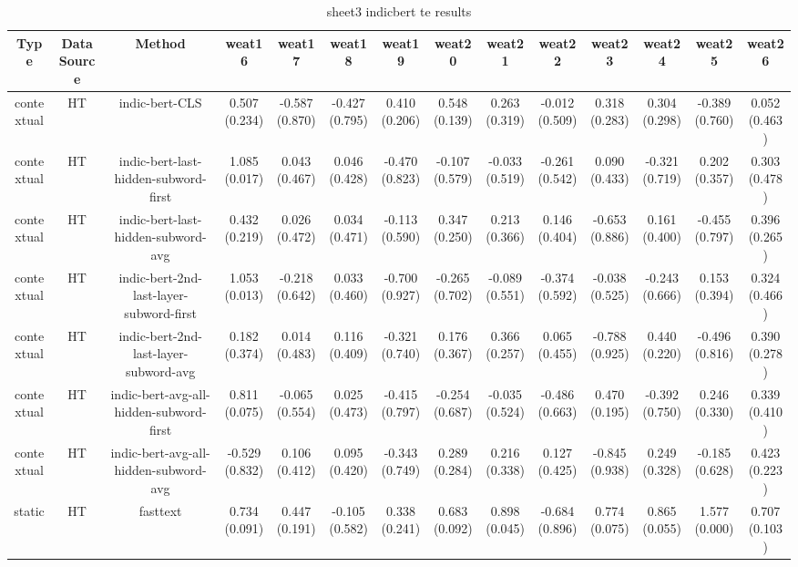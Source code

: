 \begin{sidewaystable}[htb]
    \centering
    \caption{sheet3 indicbert te results}
    \label{appendix_tab:sheet3_indicbert_te_results}
    \small
    \begin{tabular}{@{}cccccccccccccc@{}}
        \toprule
        Type & DataSource & Method & weat16 & weat17 & weat18 & weat19 & weat20 & weat21 & weat22 & weat23 & weat24 & weat25 & weat26 \\
        \midrule
        contextual & HT & indic-bert-CLS & 0.507 (0.234) & -0.587 (0.870) & -0.427 (0.795) & 0.410 (0.206) & 0.548 (0.139) & 0.263 (0.319) & -0.012 (0.509) & 0.318 (0.283) & 0.304 (0.298) & -0.389 (0.760) & 0.052 (0.463) \\
        contextual & HT & indic-bert-last-hidden-subword-first & 1.085 (0.017) & 0.043 (0.467) & 0.046 (0.428) & -0.470 (0.823) & -0.107 (0.579) & -0.033 (0.519) & -0.261 (0.542) & 0.090 (0.433) & -0.321 (0.719) & 0.202 (0.357) & 0.303 (0.478) \\
        contextual & HT & indic-bert-last-hidden-subword-avg & 0.432 (0.219) & 0.026 (0.472) & 0.034 (0.471) & -0.113 (0.590) & 0.347 (0.250) & 0.213 (0.366) & 0.146 (0.404) & -0.653 (0.886) & 0.161 (0.400) & -0.455 (0.797) & 0.396 (0.265) \\
        contextual & HT & indic-bert-2nd-last-layer-subword-first & 1.053 (0.013) & -0.218 (0.642) & 0.033 (0.460) & -0.700 (0.927) & -0.265 (0.702) & -0.089 (0.551) & -0.374 (0.592) & -0.038 (0.525) & -0.243 (0.666) & 0.153 (0.394) & 0.324 (0.466) \\
        contextual & HT & indic-bert-2nd-last-layer-subword-avg & 0.182 (0.374) & 0.014 (0.483) & 0.116 (0.409) & -0.321 (0.740) & 0.176 (0.367) & 0.366 (0.257) & 0.065 (0.455) & -0.788 (0.925) & 0.440 (0.220) & -0.496 (0.816) & 0.390 (0.278) \\
        contextual & HT & indic-bert-avg-all-hidden-subword-first & 0.811 (0.075) & -0.065 (0.554) & 0.025 (0.473) & -0.415 (0.797) & -0.254 (0.687) & -0.035 (0.524) & -0.486 (0.663) & 0.470 (0.195) & -0.392 (0.750) & 0.246 (0.330) & 0.339 (0.410) \\
        contextual & HT & indic-bert-avg-all-hidden-subword-avg & -0.529 (0.832) & 0.106 (0.412) & 0.095 (0.420) & -0.343 (0.749) & 0.289 (0.284) & 0.216 (0.338) & 0.127 (0.425) & -0.845 (0.938) & 0.249 (0.328) & -0.185 (0.628) & 0.423 (0.223) \\
        static & HT & fasttext & 0.734 (0.091) & 0.447 (0.191) & -0.105 (0.582) & 0.338 (0.241) & 0.683 (0.092) & 0.898 (0.045) & -0.684 (0.896) & 0.774 (0.075) & 0.865 (0.055) & 1.577 (0.000) & 0.707 (0.103) \\

\end{tabular}
\end{sidewaystable}
